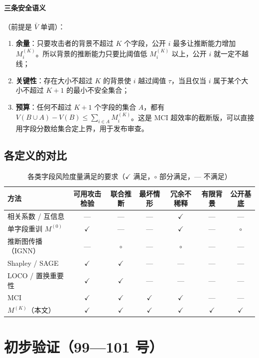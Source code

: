 \documentclass[zihao=-4,a4paper]{ctexart}
\newcommand{\M}{M^{(K)}}
\begin{document}
\paragraph{三条安全语义}（前提是 $\bar V$ 单调）：
\begin{enumerate}[leftmargin=*]
  \item \textbf{余量}：只要攻击者的背景不超过 $K$ 个字段，公开 $i$ 最多让推断能力增加 $M^{(K)}_i$。所以背景的推断能力只要比阈值低 $M^{(K)}_i$ 以上，公开 $i$ 就一定不越线；
  \item \textbf{关键性}：存在大小不超过 $K$ 的背景使 $i$ 越过阈值 $\tau$，当且仅当 $i$ 属于某个大小不超过 $K+1$ 的最小不安全集合；
  \item \textbf{预算}：任何不超过 $K+1$ 个字段的集合 $A$，都有 $V(B\cup A)-V(B)\le\sum_{i\in A}M^{(K)}_i$。这是 MCI 超效率的截断版，可以直接用字段分数给集合定上界，用于发布审查。
\end{enumerate}

\subsection{各定义的对比}

\begin{table}[H]\centering
\caption{各类字段风险度量满足的要求（$\checkmark$ 满足，$\circ$ 部分满足，— 不满足）}
\footnotesize\setlength{\tabcolsep}{4pt}
\begin{tabular}{lcccccc}
\toprule
方法 & 可用攻击检验 & 联合推断 & 最坏情形 & 冗余不稀释 & 有限背景 & 公开基底 \\
\midrule
相关系数 / 互信息 & — & — & — & $\checkmark$ & — & — \\
单字段重训 $M^{(0)}$ & $\checkmark$ & — & — & $\checkmark$ & — & $\circ$ \\
推断图传播（IGNN） & — & $\circ$ & — & $\circ$ & — & — \\
Shapley / SAGE & $\checkmark$ & $\checkmark$ & — & — & — & — \\
LOCO / 置换重要性 & $\checkmark$ & $\checkmark$ & — & — & — & — \\
MCI & $\checkmark$ & $\checkmark$ & $\checkmark$ & $\checkmark$ & — & — \\
$\M$（本文） & $\checkmark$ & $\checkmark$ & $\checkmark$ & $\checkmark$ & $\checkmark$ & $\checkmark$ \\
\bottomrule
\end{tabular}
\end{table}

\section{初步验证（99—101 号）}
\end{document}
